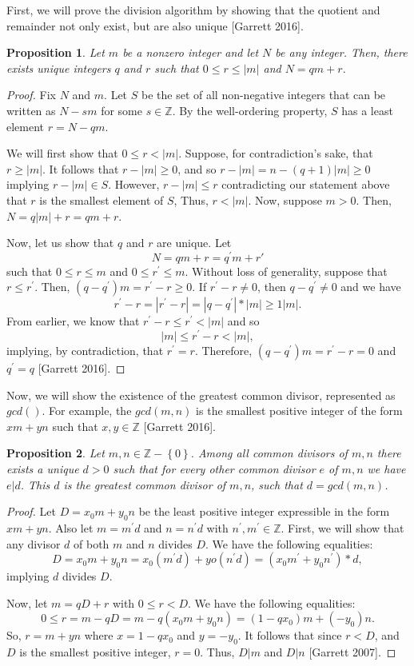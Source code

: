 \documentclass[11pt]{article}
\newtheorem{prop}{Proposition}[section]
\begin{document}
First, we will prove the division algorithm by showing that the quotient and remainder not only exist, but are also unique [Garrett 2016].

\begin{prop} 
Let $m$ be a nonzero integer and let $N$ be any integer. Then, there exists unique integers $q$ and $r$ such that $0 \leq r \leq |m|$ and $N = qm + r$.
\end{prop}

\begin{proof}
Fix $N$ and $m$. Let $S$ be the set of all non-negative integers that can be written as $N − sm$ for some $s \in \mathbb{Z}$. By the well-ordering property, $S$ has a least element $r = N − qm$. 

We will first show that $0 \leq r < |m|$. Suppose, for contradiction's sake, that $r \geq |m|$. It follows that $r − |m| \geq 0$, and so $r − |m| = n − (q+1)|m| \geq 0$ implying $r − |m| \in S$. However, $r − |m| \leq r$ contradicting our statement above that $r$ is the smallest element of $S$, Thus, $r < |m|$. Now, suppose $m > 0$. Then, $N = q|m| + r = qm + r$. 

Now, let us show that $q$ and $r$ are unique. Let $$ N = qm + r = q^{'}m + r{'} $$ such that $0 \leq r \leq m$ and $0 \leq r^{'} \leq m$. Without loss of generality, suppose that $ r \leq r^{'}$. Then, $(q - q^{'})m = r^{'} - r \geq 0$. If $r^{'} - r \neq 0$, then $q - q^{'} \neq 0$ and we have $$ r^{'} - r = |r^{'} - r| = |q - q^{'}|*|m| \geq 1|m|.$$ From earlier, we know that $r^{'} - r \leq r^{'} < |m|$ and so $$|m| \leq r^{'} - r < |m|,$$ implying, by contradiction, that $r^{'} = r$. Therefore, $(q - q^{'})m = r^{'} - r = 0$  and $q^{'} = q$ [Garrett 2016]. 
\end{proof}

Now, we will show the existence of the greatest common divisor, represented as $gcd()$.  For example, the $gcd(m,n)$ is the smallest positive integer of the form $xm + yn$ such that $x,y \in \mathbb{Z}$ [Garrett 2016]. 
\begin{prop}
Let $m,n \in \mathbb{Z} - \left\{0\right\}$. Among all common divisors of $m, n$ there exists a unique $d > 0$ such that for every other common divisor $e$ of $m, n$ we have $e|d$. This $d$ is the greatest common divisor of $m, n$, such that $d = gcd(m, n)$. 
\end{prop}
\begin{proof}
Let $D = x_0m + y_0n$ be the least positive integer expressible in the form $xm + yn$. Also let $m = m^{'}d$ and $n = n^{'}d$ with $n^{'}, m^{'} \in \mathbb{Z}$. First, we will show
that any divisor $d$ of both $m$ and $n$ divides $D$. We have the following equalities: $$D = x_0m + y_0n = x_0(m^{'}d) + yo(n^{'}d) = (x_0m^{'} + y_0n^{'}) * d, $$ implying $d$ divides $D$. 

Now, let $m = qD + r$ with $0 \leq r < D$. We have the following equalities: $$0 \leq r = m − qD = m − q(x_0m + y_0n) = (1 − qx_0)m + (−y_0)n.$$ So, $r = m + yn$ where $x = 1 − qx_0$ and $y = −y_0$. It follows that since $r < D$, and $D$ is the smallest positive integer, $r = 0$. Thus, $D|m$ and  $D|n$ [Garrett 2007]. 
\end{proof}
\end{document}
